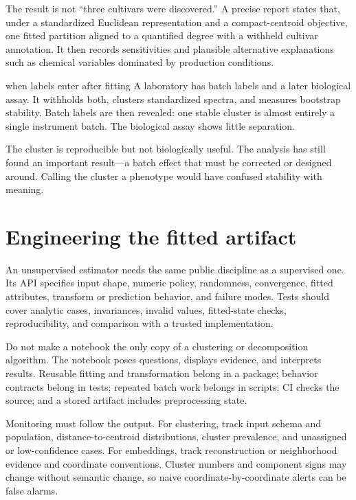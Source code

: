 The result is not ``three cultivars were discovered.'' A precise report states
that, under a standardized Euclidean representation and a compact-centroid
objective, one fitted partition aligned to a quantified degree with a withheld
cultivar annotation. It then records sensitivities and plausible alternative
explanations such as chemical variables dominated by production conditions.

\begin{workedexample}{when labels enter after fitting}
A laboratory has batch labels and a later biological assay. It withholds both,
clusters standardized spectra, and measures bootstrap stability. Batch labels
are then revealed: one stable cluster is almost entirely a single instrument
batch. The biological assay shows little separation.

The cluster is reproducible but not biologically useful. The analysis has still
found an important result---a batch effect that must be corrected or designed
around. Calling the cluster a phenotype would have confused stability with
meaning.
\end{workedexample}

\section{Engineering the fitted artifact}

An unsupervised estimator needs the same public discipline as a supervised
one. Its API specifies input shape, numeric policy, randomness, convergence,
fitted attributes, transform or prediction behavior, and failure modes. Tests
should cover analytic cases, invariances, invalid values, fitted-state checks,
reproducibility, and comparison with a trusted implementation.

Do not make a notebook the only copy of a clustering or decomposition
algorithm. The notebook poses questions, displays evidence, and interprets
results. Reusable fitting and transformation belong in a package; behavior
contracts belong in tests; repeated batch work belongs in scripts; CI checks
the source; and a stored artifact includes preprocessing state.

Monitoring must follow the output. For clustering, track input schema and
population, distance-to-centroid distributions, cluster prevalence, and
unassigned or low-confidence cases. For embeddings, track reconstruction or
neighborhood evidence and coordinate conventions. Cluster numbers and component
signs may change without semantic change, so naive coordinate-by-coordinate
alerts can be false alarms.

